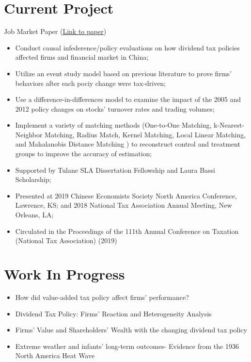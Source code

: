\documentclass{resume}
\begin{document}
\section{Current Project}
Job Market Paper (\href{https://liberalarts.tulane.edu/sites/liberalarts.tulane.edu/files/sites/default/files/Xie%20JMP_0.pdf}{Link to paper})
\begin{itemize}
  \item Conduct causal infederence/policy evaluations on how dividend tax policies affected firms and financial market in China;
  \item Utilize an event study model based on previous literature to prove firms' behaviors after each pociy change were tax-driven;
  \item Use a difference-in-differences model to examine the impact of the 2005 and 2012 policy changes on stocks’ turnover rates and trading volumes;
  \item Implement a variety of matching methods (One-to-One Matching, k-Nearest-Neighbor Matching, Radius Match, Kernel Matching, Local Linear Matching, and Mahalanobis Distance Matching ) to reconstruct control and treatment groups to improve the accuracy of estimation;
  \item Supported by Tulane SLA Dissertation Fellowship and Laura Bassi Scholarship;
  \item Presented at 2019 Chinese Economists Society North America Conference, Lawrence, KS; and 2018 National Tax Association Annual Meeting, New Orleans, LA; 
  \item Circulated in the Proceedings of the 111th Annual Conference on Taxation (National Tax Association) (2019)
\end{itemize}

\section{Work In Progress}
\begin{itemize}[parsep=0.25ex]
  \item How did value-added tax policy affect firms' performance?
  \item Dividend Tax Policy: Firms' Reaction and Heterogeneity Analysis
  \item Firms' Value and Shareholders' Wealth with the changing dividend tax policy
  \item Extreme weather and infants' long-term outcomes- Evidence from the 1936 North America Heat Wave 
\end{itemize}
\end{document}
